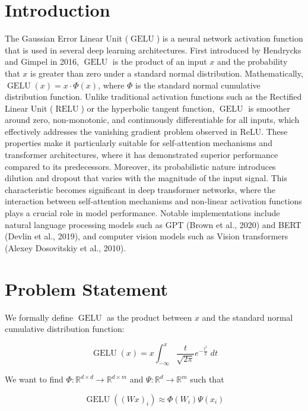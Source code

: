 \documentclass{article}
\begin{document}
\section{Introduction}
The Gaussian Error Linear Unit ($\operatorname{GELU}$) is a neural network activation function that is used in several deep learning architectures. First introduced by Hendrycks and Gimpel in 2016, $\operatorname{GELU}$ is the product of an input $x$ and the probability that $x$ is greater than zero under a standard normal distribution. Mathematically, $\operatorname{GELU}(x) = x\cdot \Phi(x)$, where $\Phi$ is the standard normal cumulative distribution function. Unlike traditional activation functions such as the Rectified Linear Unit ($\operatorname{RELU}$) or the hyperbolic tangent function, $\operatorname{GELU}$ is smoother around zero, non-monotonic, and continuously differentiable for all inputs, which effectively addresses the vanishing gradient problem observed in ReLU. These properties make it particularly suitable for self-attention mechanisms and transformer architectures, where it has demonstrated superior performance compared to its predecessors. Moreover, its probabilistic nature introduces dilution and dropout that varies with the magnitude of the input signal. This characteristic becomes significant in deep transformer networks, where the interaction between self-attention mechanisms and non-linear activation functions plays a crucial role in model performance. Notable implementations include natural language processing models such as GPT (Brown et al., 2020) and BERT (Devlin et al., 2019), and computer vision models such as Vision transformers (Alexey Dosovitskiy et al., 2010). 

\section{Problem Statement}

We formally define $\operatorname{GELU}$ as the product between $x$ and the standard normal cumulative distribution function:

\begin{equation}
    \operatorname{GELU}(x) = x \int_{-\infty}^{x} \frac{t}{\sqrt{2\pi}} e^{-\frac{t^2}{2}} \; dt
    \label{eq:gelu}
\end{equation}

We want to find $\Phi: \mathbb{R}^{d \times d} \rightarrow \mathbb{R}^{d \times m}$ and $
\Psi: \mathbb{R}^d \rightarrow \mathbb{R}^m$ such that

$$
\operatorname{GELU}((Wx)_{i}) \approx \Phi(W_i)\Psi(x_i)
$$
\end{document}
